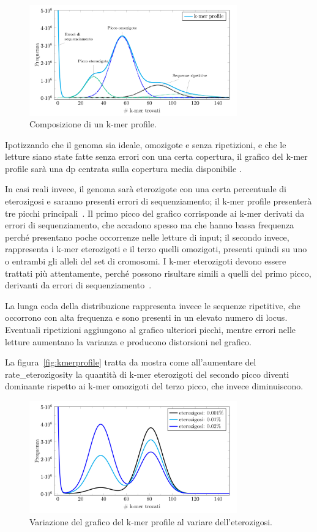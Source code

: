 \documentclass[crop=false, class=book]{standalone}
\begin{document}
	
	\begin{figure}[h]
		\centering
		\includegraphics[width=0.8\textwidth]{capitoli/introduzione/profilecomp.png}
		\caption{Composizione di un k-mer profile.}
		\label{fig:profilecomp}
	\end{figure}
	
	Ipotizzando che il genoma sia ideale, omozigote e senza ripetizioni, e che le letture siano state fatte senza errori con una certa copertura, il grafico del k-mer profile sarà una \gls{dp} centrata sulla copertura media disponibile \cite{li2003estimating}.
	
	In casi reali invece, il genoma sarà eterozigote con una certa percentuale di eterozigosi e saranno presenti errori di sequenziamento; il k-mer profile presenterà tre picchi principali~\cite{sun2017findGSE}.
	Il primo picco del grafico corrisponde ai k-mer derivati da errori di sequenziamento, che accadono spesso ma che hanno bassa frequenza perché presentano poche occorrenze nelle letture di input; il secondo invece, rappresenta i k-mer eterozigoti e il terzo quelli omozigoti, presenti quindi su uno o entrambi gli alleli del set di cromosomi. I k-mer eterozigoti devono essere trattati più attentamente, perché possono risultare simili a quelli del primo picco, derivanti da errori di sequenziamento~\cite{sohn2016present}.	
	
	La lunga coda della distribuzione rappresenta invece le sequenze ripetitive, che occorrono con alta frequenza e sono presenti in un elevato numero di \gls{locus}. Eventuali ripetizioni aggiungono al grafico ulteriori picchi, mentre errori nelle letture aumentano la varianza e producono distorsioni nel grafico.
	
	La figura~\vref{fig:kmerprofile} tratta da \cite{vurture2017genomescope} mostra come all'aumentare del \gls{rate_eterozigosity} la quantità di k-mer eterozigoti del secondo picco diventi dominante rispetto ai k-mer omozigoti del terzo picco, che invece diminuiscono.
	
	\begin{figure}
		\centering
		\includegraphics[width=0.8\textwidth]{capitoli/introduzione/kmerprofile.png}
		\caption{Variazione del grafico del k-mer profile al variare dell'eterozigosi.}
		\label{fig:kmerprofile}
	\end{figure}
\end{document}
